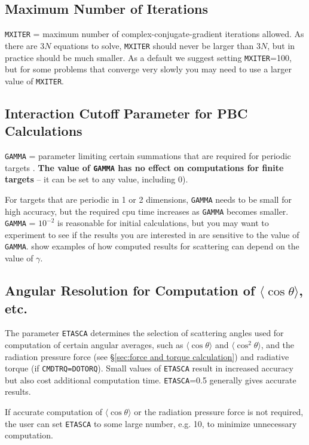\subsection{ Maximum Number of Iterations}

{\tt MXITER} = maximum number of complex-conjugate-gradient iterations allowed.
As there are $3N$ equations to solve, {\tt MXITER} should never be larger
than $3N$, but in practice should be much smaller.  As a default we suggest
setting {\tt MXITER}=100, but for some problems that converge very slowly
you may need to use a larger value of {\tt MXITER}.

\subsection{ Interaction Cutoff Parameter for PBC Calculations}
{\tt GAMMA} = parameter limiting certain summations that are required for
periodic targets \citep[see]{Draine+Flatau_2008a}.  
{\bf The value of {\tt GAMMA} has no effect on 
computations for finite targets} --
it can be set to any value, including $0$).

For targets that are periodic in 1 or 2 dimensions,
{\tt GAMMA} needs to be small for high accuracy, but
the required cpu time increases as {\tt GAMMA} becomes smaller.
{\tt GAMMA} = $10^{-2}$ is reasonable for initial calculations,
but you may want to experiment to see if the results you are interested
in are sensitive to the value of {\tt GAMMA}.
\citet{Draine+Flatau_2008a} show examples of how computed results for scattering
can depend on the value of $\gamma$.

\subsection{ Angular Resolution for Computation of 
            $\langle\cos\theta\rangle$, etc.}
The parameter {\tt ETASCA} determines the selection of scattering angles used
for computation of certain angular averages, such as 
$\langle\cos\theta\rangle$ and $\langle\cos^2\theta\rangle$, 
and the radiation pressure force 
(see \S\ref{sec:force and torque calculation}) and radiative torque 
(if {\tt CMDTRQ=DOTORQ}).
Small values of {\tt ETASCA} result in increased accuracy but also cost
additional computation time.
{\tt ETASCA}=0.5 generally gives accurate results.

If accurate computation of $\langle\cos\theta\rangle$
or the radiation pressure force is not required, the user can set
{\tt ETASCA} to some large number, e.g. 10, to minimize unnecessary
computation. 

